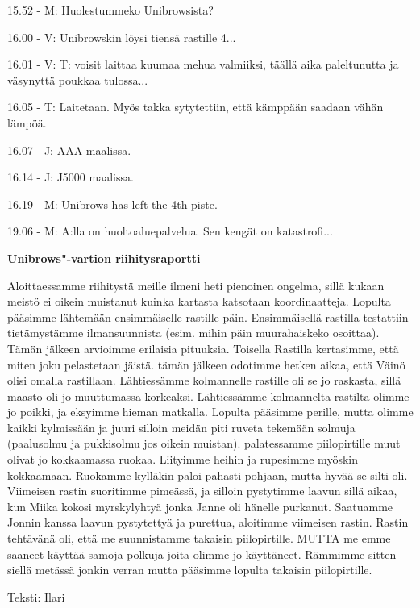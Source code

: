 \begin{multicols}{2}
15.52 - M: Huolestummeko Unibrowsista?

16.00 - V: Unibrowskin löysi tiensä rastille 4...

16.01 - V: T: voisit laittaa kuumaa mehua valmiiksi, täällä aika 
paleltunutta ja väsynyttä poukkaa tulossa...

16.05 - T: Laitetaan. Myös takka sytytettiin, että kämppään saadaan 
vähän lämpöä.

16.07 - J: AAA maalissa.

16.14 - J: J5000 maalissa.

16.19 - M: Unibrows has left the 4th piste.

19.06 - M: A:lla on huoltoaluepalvelua. Sen kengät on katastrofi...
\end{multicols}

\medskip

\noindent\textbf{Unibrows"-vartion riihitysraportti}

\begin{multicols}{2}
\noindent Aloittaessamme riihitystä meille ilmeni heti pienoinen ongelma, 
sillä kukaan meistö ei oikein muistanut kuinka kartasta katsotaan 
koordinaatteja. Lopulta pääsimme lähtemään ensimmäiselle rastille päin. 
Ensimmäisellä rastilla testattiin tietämystämme ilmansuunnista (esim. mihin 
päin muurahaiskeko osoittaa). Tämän jälkeen arvioimme erilaisia pituuksia. 
Toisella Rastilla kertasimme, että miten joku pelastetaan jäistä. tämän 
jälkeen odotimme hetken aikaa, että Väinö olisi omalla rastillaan. 
Lähtiessämme kolmannelle rastille oli se jo raskasta, sillä maasto oli jo 
muuttumassa korkeaksi. Lähtiessämme kolmannelta rastilta olimme jo poikki, ja 
eksyimme hieman matkalla. Lopulta pääsimme perille, mutta olimme kaikki 
kylmissään ja juuri silloin meidän piti ruveta tekemään solmuja 
(paalusolmu ja pukkisolmu jos oikein muistan). palatessamme piilopirtille muut 
olivat jo kokkaamassa ruokaa. Liityimme heihin ja rupesimme myöskin 
kokkaamaan. Ruokamme kylläkin paloi pahasti pohjaan, mutta hyvää se silti 
oli. Viimeisen rastin suoritimme pimeässä, ja silloin pystytimme laavun 
sillä aikaa, kun Miika kokosi myrskylyhtyä jonka Janne oli hänelle purkanut. 
Saatuamme Jonnin kanssa laavun pystytettyä ja purettua, aloitimme viimeisen 
rastin. Rastin tehtävänä oli, että me suunnistamme takaisin piilopirtille. 
MUTTA me emme saaneet käyttää samoja polkuja joita olimme jo käyttäneet. 
Rämmimme sitten siellä metässä jonkin verran mutta pääsimme lopulta 
takaisin piilopirtille. 
\end{multicols}

\medskip

\noindent\null\hfill Teksti: Ilari
